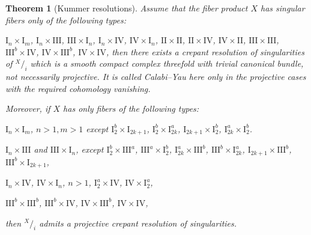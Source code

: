 \documentclass[a4paper]{amsart}
\theoremstyle{plain}
\newtheorem{Thm}{Theorem}[section]
\theoremstyle{definition}
\theoremstyle{remark}
\numberwithin{equation}{section}
\newcommand*\quot[2]{{^{\textstyle #1}\big/_{\textstyle #2}}}
\begin{document}
\begin{Thm}[Kummer resolutions]\label{thm:kummer}
Assume that the fiber product $X$ has singular fibers only of the following types:

\noindent
$\mathrm{I}_{n}\times \mathrm{I}_{m}$, $\mathrm{I}_{n}\times \mathrm{III}$, $\mathrm{III}\times \mathrm{I}_{n}$, $\mathrm{I}_{n}\times \mathrm{IV}$, $\mathrm{IV}\times \mathrm{I}_{n}$, $\mathrm{II}\times \mathrm{II}$, $\mathrm{II}\times \mathrm{IV}$, $\mathrm{IV}\times \mathrm{II}$, $\mathrm{III}\times \mathrm{III}$, $\mathrm{III}^{b}\times \mathrm{IV}$, $\mathrm{IV}\times \mathrm{III}^{b}$, $\mathrm{IV}\times \mathrm{IV}$,
\noindent
then there exists a crepant resolution of singularities of $\quot{X}{i}$ which is a smooth
compact complex threefold with trivial canonical bundle, not necessarily
projective.  It is called Calabi--Yau here only in the projective cases
with the required cohomology vanishing.

Moreover, if $X$ has only fibers of the following types:

\noindent
$\mathrm{I}_{n}\times \mathrm{I}_{m}$, $n>1, m>1$ except $\mathrm{I}_{2}^{b}\times \mathrm{I}_{2k+1}$,
$\mathrm{I}_{2}^{b}\times \mathrm{I}_{2k}^{a}$,  $\mathrm{I}_{2k+1}\times \mathrm{I}_{2}^{b}$,
$\mathrm{I}_{2k}^{a}\times \mathrm{I}_{2}^{b}$.

\noindent
$\mathrm{I}_{n}\times \mathrm{III}$ and  $\mathrm{III}\times \mathrm{I}_{n}$, except
$\mathrm{I}_{2}^{b}\times \mathrm{III}^{a}$,  $\mathrm{III}^{a}\times \mathrm{I}_{2}^{b}$,
$\mathrm{I}_{2k}^{a}\times \mathrm{III}^{b}$,  $\mathrm{III}^{b}\times \mathrm{I}_{2k}^{a}$,
$\mathrm{I}_{2k+1}\times \mathrm{III}^{b}$,  $\mathrm{III}^{b}\times \mathrm{I}_{2k+1}$,



\noindent
$\mathrm{I}_{n}\times \mathrm{IV}$,   $\mathrm{IV}\times \mathrm{I}_{n}$, $n>1$,
$\mathrm{I}_{2}^{a}\times \mathrm{IV}$,   $\mathrm{IV}\times \mathrm{I}_{2}^{a}$,

\noindent
$\mathrm{III}^{b}\times \mathrm{III}^{b}$, $\mathrm{III}^{b}\times \mathrm{IV}$, $\mathrm{IV}\times \mathrm{III}^{b}$, $\mathrm{IV}\times \mathrm{IV}$,

\noindent
then  $\quot{X}{i}$
admits a projective crepant resolution of singularities.
\end{Thm}
\end{document}

